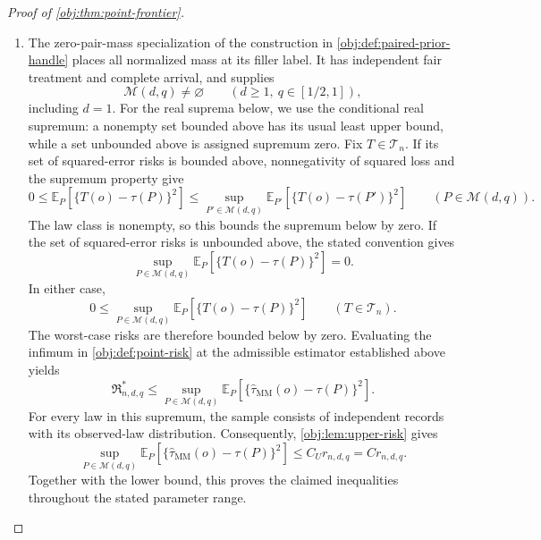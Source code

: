 \documentclass[11pt]{article}
\begin{document}
\begin{proof}[Proof of \cref{obj:thm:point-frontier}]
\begin{enumerate}
The Poisson weights satisfy
\[
\omega_{n,N}\ge0,
\qquad
0\le\sum_{N=0}^{n}\omega_{n,N}
\le\sum_{N=0}^{\infty}\omega_{n,N}=1.
\]
Since the randomized estimate is zero when \(N>n\), its conditional average is
\[
\widehat\tau_{\mathrm{MM}}(o)
=\sum_{N=0}^{n}\omega_{n,N}\overline\tau_N(o)
\]
in this branch. Multiplying the bounds on each average by its nonnegative weight and summing gives
\[
-1
\le-\sum_{N=0}^{n}\omega_{n,N}
\le\widehat\tau_{\mathrm{MM}}(o)
\le\sum_{N=0}^{n}\omega_{n,N}
\le1.
\]
The projected formulas and finite averages are measurable. Thus, on the entire Cartesian sample space,
\[
\widehat\tau_{\mathrm{MM}}\in\mathcal T_n,
\]
with \(\mathcal T_n\) as defined in \cref{obj:synth_6}.

\item The zero-pair-mass specialization of the construction in \cref{obj:def:paired-prior-handle} places all normalized mass at its filler label. It has independent fair treatment and complete arrival, and supplies
\[
\mathcal M(d,q)\ne\varnothing
\qquad(d\ge1,\ q\in[1/2,1]),
\]
including \(d=1\). For the real suprema below, we use the conditional real supremum: a nonempty set bounded above has its usual least upper bound, while a set unbounded above is assigned supremum zero. Fix \(T\in\mathcal T_n\). If its set of squared-error risks is bounded above, nonnegativity of squared loss and the supremum property give
\[
0\le
\mathbb E_P\!\left[
\{T(o)-\tau(P)\}^{2}
\right]
\le
\sup_{P'\in\mathcal M(d,q)}
\mathbb E_{P'}\!\left[
\{T(o)-\tau(P')\}^{2}
\right]
\qquad(P\in\mathcal M(d,q)).
\]
The law class is nonempty, so this bounds the supremum below by zero. If the set of squared-error risks is unbounded above, the stated convention gives
\[
\sup_{P\in\mathcal M(d,q)}
\mathbb E_P\!\left[
\{T(o)-\tau(P)\}^{2}
\right]=0.
\]
In either case,
\[
0\le
\sup_{P\in\mathcal M(d,q)}
\mathbb E_P\!\left[
\{T(o)-\tau(P)\}^{2}
\right]
\qquad(T\in\mathcal T_n).
\]
The worst-case risks are therefore bounded below by zero. Evaluating the infimum in \cref{obj:def:point-risk} at the admissible estimator established above yields
\[
\mathfrak R^*_{n,d,q}
\le
\sup_{P\in\mathcal M(d,q)}
\mathbb E_P\!\left[
\{\widehat\tau_{\mathrm{MM}}(o)-\tau(P)\}^{2}
\right].
\]
For every law in this supremum, the sample consists of independent records with its observed-law distribution. Consequently, \cref{obj:lem:upper-risk} gives
\[
\sup_{P\in\mathcal M(d,q)}
\mathbb E_P\!\left[
\{\widehat\tau_{\mathrm{MM}}(o)-\tau(P)\}^{2}
\right]
\le C_U r_{n,d,q}
=C r_{n,d,q}.
\]
Together with the lower bound, this proves the claimed inequalities throughout the stated parameter range.
\end{enumerate}
\end{proof}
\end{document}
